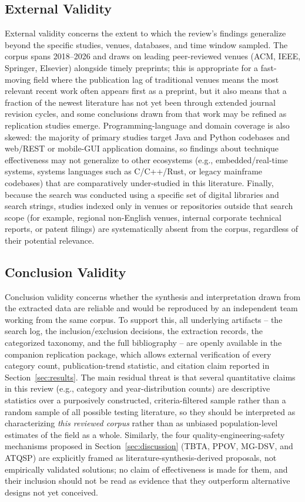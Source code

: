 \subsection{External Validity}
External validity concerns the extent to which the review's findings
generalize beyond the specific studies, venues, databases, and time
window sampled. The corpus spans 2018--2026 and draws on leading
peer-reviewed venues (ACM, IEEE, Springer, Elsevier) alongside timely
preprints; this is appropriate for a fast-moving field where the
publication lag of traditional venues means the most relevant recent
work often appears first as a preprint, but it also
means that a fraction of the newest literature has not yet been through
extended journal revision cycles, and some conclusions
drawn from that work may be refined as replication studies emerge.
Programming-language and domain coverage is
also skewed: the majority of primary studies target Java and Python
codebases and web/REST or mobile-GUI application domains, so findings
about technique effectiveness may not generalize to other ecosystems
(e.g., embedded/real-time systems, systems languages such as C/C++/Rust,
or legacy mainframe codebases) that are comparatively under-studied in
this literature. Finally, because the search was conducted using a specific
set of digital libraries and search strings,
studies indexed only in venues or repositories outside that search
scope (for example, regional non-English venues, internal corporate
technical reports, or patent filings) are systematically absent from
the corpus, regardless of their potential relevance.

\subsection{Conclusion Validity}
Conclusion validity concerns whether the synthesis and interpretation
drawn from the extracted data are reliable and would be reproduced by
an independent team working from the same corpus. To support this, all
underlying artifacts -- the search log, the inclusion/exclusion
decisions, the extraction records, the categorized taxonomy,
and the full bibliography -- are openly available in the companion
replication package, which allows external
verification of every category count, publication-trend statistic, and
citation claim reported in Section~\ref{sec:results}. The main residual
threat is that several quantitative claims in this review (e.g.,
category and year-distribution counts) are descriptive statistics over
a purposively constructed, criteria-filtered sample rather than a
random sample of all possible testing literature, so
they should be interpreted as characterizing \emph{this reviewed
corpus} rather than as unbiased population-level estimates of the
field as a whole. Similarly, the four quality-engineering-safety
mechanisms proposed in Section~\ref{sec:discussion} (TBTA, PPOV,
MG-DSV, and ATQSP) are explicitly framed as literature-synthesis-derived
proposals, not empirically validated solutions; no claim of
effectiveness is made for them, and their inclusion should not be
read as evidence that they outperform alternative designs not yet
conceived.
